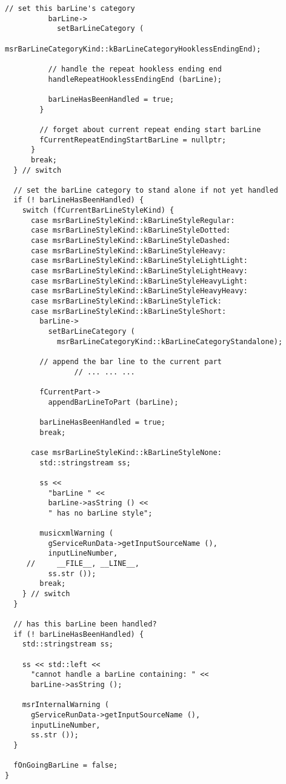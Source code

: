 \begin{lstlisting}[language=CPlusPlus]
          // set this barLine's category
          barLine->
            setBarLineCategory (
              msrBarLineCategoryKind::kBarLineCategoryHooklessEndingEnd);

          // handle the repeat hookless ending end
          handleRepeatHooklessEndingEnd (barLine);

          barLineHasBeenHandled = true;
        }

        // forget about current repeat ending start barLine
        fCurrentRepeatEndingStartBarLine = nullptr;
      }
      break;
  } // switch

  // set the barLine category to stand alone if not yet handled
  if (! barLineHasBeenHandled) {
    switch (fCurrentBarLineStyleKind) {
      case msrBarLineStyleKind::kBarLineStyleRegular:
      case msrBarLineStyleKind::kBarLineStyleDotted:
      case msrBarLineStyleKind::kBarLineStyleDashed:
      case msrBarLineStyleKind::kBarLineStyleHeavy:
      case msrBarLineStyleKind::kBarLineStyleLightLight:
      case msrBarLineStyleKind::kBarLineStyleLightHeavy:
      case msrBarLineStyleKind::kBarLineStyleHeavyLight:
      case msrBarLineStyleKind::kBarLineStyleHeavyHeavy:
      case msrBarLineStyleKind::kBarLineStyleTick:
      case msrBarLineStyleKind::kBarLineStyleShort:
        barLine->
          setBarLineCategory (
            msrBarLineCategoryKind::kBarLineCategoryStandalone);

        // append the bar line to the current part
				// ... ... ...

        fCurrentPart->
          appendBarLineToPart (barLine);

        barLineHasBeenHandled = true;
        break;

      case msrBarLineStyleKind::kBarLineStyleNone:
        std::stringstream ss;

        ss <<
          "barLine " <<
          barLine->asString () <<
          " has no barLine style";

        musicxmlWarning (
          gServiceRunData->getInputSourceName (),
          inputLineNumber,
     //     __FILE__, __LINE__,
          ss.str ());
        break;
    } // switch
  }

  // has this barLine been handled?
  if (! barLineHasBeenHandled) {
    std::stringstream ss;

    ss << std::left <<
      "cannot handle a barLine containing: " <<
      barLine->asString ();

    msrInternalWarning (
      gServiceRunData->getInputSourceName (),
      inputLineNumber,
      ss.str ());
  }

  fOnGoingBarLine = false;
}
\end{lstlisting}


